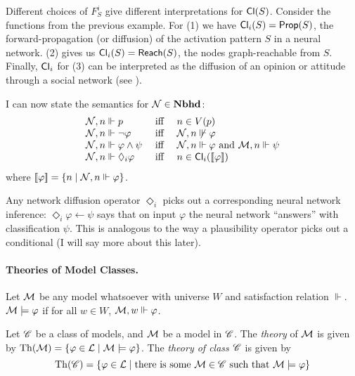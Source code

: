 \documentclass[letterpaper]{article}
\begin{document}
\begin{example*}
    Different choices of $F^i_S$ give different interpretations for $\mathsf{Cl}(S)$.  Consider the functions from the previous example.  For (1) we have $\mathsf{Cl}_i(S) = \mathsf{Prop}(S)$, the forward-propagation (or diffusion) of the activation pattern $S$ in a neural network.  (2) gives us $\mathsf{Cl}_i(S) = \mathsf{Reach}(S)$, the nodes graph-reachable from $S$.  Finally, $\mathsf{Cl}_i$ for (3) can be interpreted as the diffusion of an opinion or attitude through a social network (see \cite{baltag2019socialnetworks}).
\end{example*}

I can now state the semantics for $\mathcal{N} \in \textrm{\textbf{Nbhd}}$:
\[
\begin{array}{lcl}
    \mathcal{N}, n \Vdash p & \mbox{ iff } & n \in V(p)\\
    \mathcal{N}, n \Vdash \neg \varphi & \mbox{ iff } & \mathcal{N}, n \not \Vdash \varphi\\
    \mathcal{N}, n \Vdash \varphi \land \psi & \mbox{ iff } & \mathcal{N}, n \Vdash \varphi \mbox{ and } \mathcal{M}, n \Vdash \psi\\
    \mathcal{N}, n \Vdash \Diamond_i \varphi & \mbox{ iff } & 
    n \in \mathsf{Cl}_i([\![\mbox{\em $ \varphi $\/}]\!])
\end{array}
\]
where $[\![\mbox{\em $ \varphi $\/}]\!] = \{ n \mid \mathcal{N}, n \Vdash \varphi \}$.  

Any network diffusion operator $\Diamond_i$ picks out a corresponding neural network inference: $\Diamond_i \varphi \leftarrow \psi$ says that on input $\varphi$ the neural network ``answers'' with classification $\psi$.  This is analogous to the way a plausibility operator picks out a conditional (I will say more about this later).

\paragraph*{Theories of Model Classes.} 

\begin{definition}
    Let $\mathcal{M}$ be any model whatsoever with universe $W$ and satisfaction relation $\Vdash$.  $\mathcal{M} \models \varphi$ if for all $w \in W$, $\mathcal{M}, w \Vdash \varphi$.
\end{definition}

\begin{definition}
    Let $\mathscr{C}$ be a class of models, and $\mathcal{M}$ be a model in $\mathscr{C}$.  The \emph{theory} of $\mathcal{M}$ is given by $\mathrm{Th}( \mathcal{M} ) = \{ \varphi \in \mathcal{L} \mid \mathcal{M} \models \varphi \}$.  The \emph{theory of class $\mathscr{C}$} is given by 
    \[
        \mathrm{Th}( \mathscr{C} ) = \{ \varphi \in \mathcal{L} \mid \textrm{there is some } \mathcal{M} \in \mathscr{C} \textrm{ such that } \mathcal{M} \models \varphi \}
    \]
\end{definition}
\end{document}

